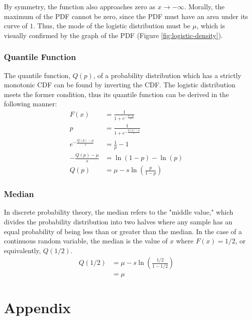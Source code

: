 \documentclass[titlepage,12 pt]{article}
\begin{document}
By symmetry, the function also approaches zero as $x \to -\infty$. Morally, the maximum of the PDF cannot be zero,
since the PDF must have an area under its curve of $1$. Thus, the mode of the logistic distribution must be $\mu$,
which is visually confirmed by the graph of the PDF (Figure \ref{fig:logistic-density}).

\subsubsection{Quantile Function}

The quantile function, $Q(p)$, of a probability distribution which has a strictly monotonic CDF
can be found by inverting the CDF. The logistic distribution meets the former condition, thus its quantile function
can be derived in the following manner:
\begin{align*}
    F(x) & = \frac{1}{1 + e^{-\frac{x-\mu}{s}}} \\
    p & = \frac{1}{1 + e^{-\frac{Q(p)-\mu}{s}}} \\
    e^{-\frac{Q(p)-\mu}{s}} & = \frac{1}{p} - 1 \\
    -\frac{Q(p)-\mu}{s} & = \ln(1 - p) - \ln(p) \\
    Q(p) & = \mu - s\ln\left(\frac{p}{1-p}\right)
\end{align*}

\subsubsection{Median}

In discrete probability theory, the median refers to the "middle value," which divides the probability distribution
into two halves where any sample has an equal probability of being less than or greater than the median. In the case
of a continuous random variable, the median is the value of $x$ where $F(x) = 1/2$, or equivalently, $Q(1/2)$.
\begin{align*}
    Q(1/2) & = \mu - s\ln\left(\frac{1/2}{1-1/2}\right) \\
           & = \mu
\end{align*}

\section{Appendix}
\end{document}
